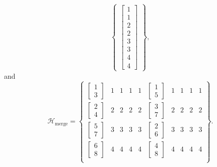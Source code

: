 {\begin{equation}
\begin{Bmatrix}
		\begin{bmatrix} 1 \\ 1 \\ 2 \\ 2 \\ 3 \\ 3 \\ 4 \\ 4 \end{bmatrix}
	\end{Bmatrix},
\end{equation}
and
\begin{equation} \label{eq:Hmerge_SFex2}
	\mathcal{H}_{\text{merge}} = \begin{Bmatrix}
		\begin{bmatrix}	1 \\ 3 \end{bmatrix} & 1 & 1 & 1 & 1 & \begin{bmatrix}	1 \\ 5 \end{bmatrix} & 1 & 1 & 1 & 1 \\
		\begin{bmatrix}	2 \\ 4 \end{bmatrix} & 2 & 2 & 2 & 2 & \begin{bmatrix}	3 \\ 7 \end{bmatrix} & 2 & 2 & 2 & 2 \\
		\begin{bmatrix}	5 \\ 7 \end{bmatrix} & 3 & 3 & 3 & 3 & \begin{bmatrix}	2 \\ 6 \end{bmatrix} & 3 & 3 & 3 & 3 \\
		\begin{bmatrix}	6 \\ 8 \end{bmatrix} & 4 & 4 & 4 & 4 & \begin{bmatrix}	4 \\ 8 \end{bmatrix} & 4 & 4 & 4 & 4 \\
	\end{Bmatrix}.
\end{equation}

}
